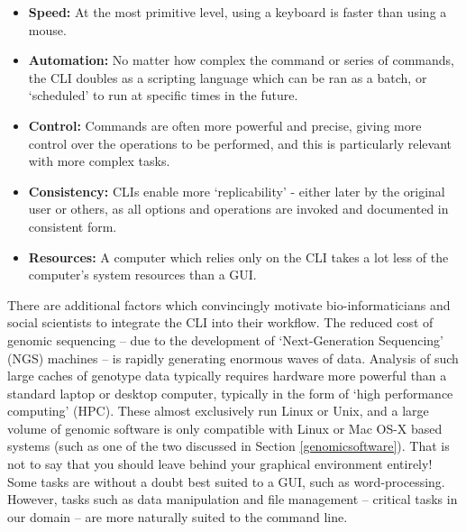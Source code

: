 \documentclass[11pt]{article}
\begin{document}
\begin{itemize}
\item \textbf{Speed:} At the most primitive level, using a keyboard is faster than using a mouse.
\item \textbf{Automation:} No matter how complex the command or series of commands, the CLI doubles as a scripting language which can be ran as a batch, or `scheduled' to run at specific times in the future.
\item \textbf{Control:} Commands are often more powerful and precise, giving more control over the operations to be performed, and this is particularly relevant with more complex tasks.
\item \textbf{Consistency:} CLIs enable more `replicability' - either later by the original user or others, as all options and operations are invoked and documented in consistent form.
\item \textbf{Resources:} A computer which relies only on the CLI takes a lot less of the computer's system resources than a GUI.
\end{itemize}

There are additional factors which convincingly motivate bio-informaticians and social scientists to integrate the CLI into their workflow. The reduced cost of genomic sequencing -- due to the development of `Next-Generation Sequencing' (NGS) machines -- is rapidly generating enormous waves of data. Analysis of such large caches of genotype data typically requires hardware more powerful than a standard laptop or desktop computer, typically in the form of `high performance computing' (HPC). These almost exclusively run Linux or Unix, and a large volume of genomic software is only compatible with Linux or Mac OS-X based systems (such as one of the two discussed in Section \ref{genomicsoftware}). That is not to say that you should leave behind your graphical environment entirely! Some tasks are without a doubt best suited to a GUI, such as word-processing. However, tasks such as data manipulation and file management -- critical tasks in our domain -- are more naturally suited to the command line.
\end{document}
